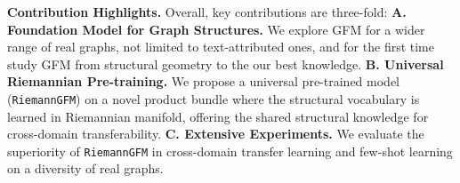



\textbf{Contribution Highlights.} 
Overall, key contributions are three-fold:
\textbf{A. Foundation Model for Graph Structures.} 
We explore GFM  for a wider range of real graphs, not limited to text-attributed ones, 
and for the first time study GFM from structural geometry to the our best  knowledge.
\textbf{B. Universal Riemannian Pre-training.} 
We propose a universal pre-trained model (\texttt{RiemannGFM}) on a novel product bundle
where  the structural vocabulary is learned in Riemannian manifold, offering the shared structural knowledge for cross-domain transferability.
\textbf{C. Extensive Experiments.} 
We evaluate the superiority of \texttt{RiemannGFM} in cross-domain transfer learning and few-shot learning on a diversity of real graphs.



